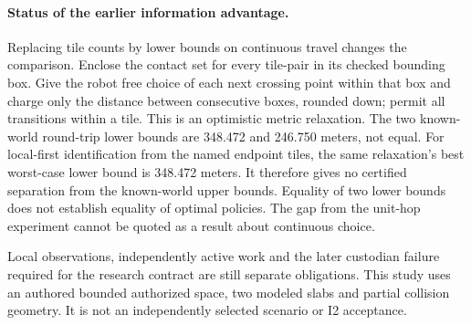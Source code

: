 \documentclass{article}
\begin{document}
\paragraph{Status of the earlier information advantage.}
Replacing tile counts by lower bounds on continuous travel
changes the comparison. Enclose the contact set for every
tile-pair in its checked bounding box. Give the robot free choice
of each next crossing point within that box and charge only the
distance between consecutive boxes, rounded down; permit all
transitions within a tile. This is an optimistic metric
relaxation. The two known-world round-trip lower bounds are
348.472 and 246.750 meters, not equal. For local-first
identification from the named endpoint tiles, the same relaxation's
best worst-case lower bound is 348.472 meters. It therefore gives
no certified separation from the known-world upper bounds.
Equality of two lower bounds does not establish equality of
optimal policies. The gap from the unit-hop experiment cannot
be quoted as a result about continuous choice.

Local observations, independently active work and the later
custodian failure required for the research contract are still
separate obligations. This study uses an authored bounded
authorized space, two modeled slabs and partial collision geometry.
It is not an independently selected scenario or I2 acceptance.
\end{document}
